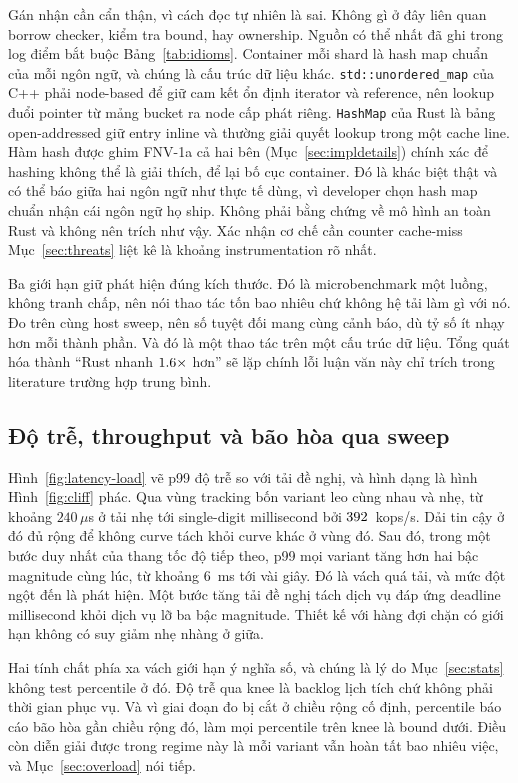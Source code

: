Gán nhận cần cẩn thận, vì cách đọc tự nhiên là sai. Không gì ở đây
liên quan borrow checker, kiểm tra bound, hay ownership. Nguồn có thể nhất
đã ghi trong log điểm bắt buộc Bảng~\ref{tab:idioms}. Container mỗi shard là
hash map chuẩn của mỗi ngôn ngữ, và chúng là cấu trúc dữ liệu khác. \texttt{std::unordered\_map} của C++ phải node-based để giữ cam kết ổn định iterator và reference,
nên lookup đuổi pointer từ mảng bucket ra node cấp phát riêng. \texttt{HashMap} của Rust là bảng open-addressed giữ entry inline và
thường giải quyết lookup trong một cache line. Hàm hash được ghim FNV-1a cả hai
bên (Mục~\ref{sec:impldetails}) chính xác để hashing không thể là giải thích,
để lại bố cục container. Đó là khác biệt thật và có thể báo giữa hai
ngôn ngữ như thực tế dùng, vì developer chọn hash map chuẩn nhận
cái ngôn ngữ họ ship. Không phải bằng chứng về mô hình an toàn Rust và không
nên trích như vậy. Xác nhận cơ chế cần counter cache-miss
Mục~\ref{sec:threats} liệt kê là khoảng instrumentation rõ nhất.

Ba giới hạn giữ phát hiện đúng kích thước. Đó là microbenchmark một luồng, không tranh chấp,
nên nói thao tác tốn bao nhiêu chứ không hệ tải làm gì với nó. Đo trên cùng host sweep, nên số tuyệt đối mang cùng cảnh báo, dù tỷ số ít nhạy hơn mỗi thành phần. Và đó là một
thao tác trên một cấu trúc dữ liệu. Tổng quát hóa thành ``Rust nhanh $1.6\times$
hơn'' sẽ lặp chính lỗi luận văn này chỉ trích trong literature trường hợp trung bình.

\subsection{Độ trễ, throughput và bão hòa qua sweep}
Hình~\ref{fig:latency-load} vẽ p99 độ trễ so với tải đề nghị, và hình dạng là
hình Hình~\ref{fig:cliff} phác. Qua vùng tracking bốn variant leo
cùng nhau và nhẹ, từ khoảng $240\,\mu$s ở tải nhẹ tới single-digit millisecond
bởi $392$~kops/s. Dải tin cậy ở đó đủ rộng để không curve tách
khỏi curve khác ở vùng đó. Sau đó, trong một bước duy nhất của thang tốc độ tiếp theo,
p99 mọi variant tăng hơn hai bậc magnitude cùng lúc, từ khoảng $6$~ms tới
vài giây. Đó là vách quá tải, và mức đột ngột đến là phát hiện. Một
bước tăng tải đề nghị tách dịch vụ đáp ứng deadline millisecond khỏi dịch vụ lỡ
ba bậc magnitude. Thiết kế với hàng đợi chặn có giới hạn không có suy giảm nhẹ nhàng
ở giữa.

Hai tính chất phía xa vách giới hạn ý nghĩa số, và chúng là lý do
Mục~\ref{sec:stats} không test percentile ở đó. Độ trễ qua knee là backlog
lịch tích chứ không phải thời gian phục vụ. Và vì giai đoạn đo bị cắt ở
chiều rộng cố định, percentile báo cáo bão hòa gần chiều rộng đó, làm mọi percentile
trên knee là bound dưới. Điều còn diễn giải được trong regime này là mỗi variant
vẫn hoàn tất bao nhiêu việc, và Mục~\ref{sec:overload} nói tiếp.

